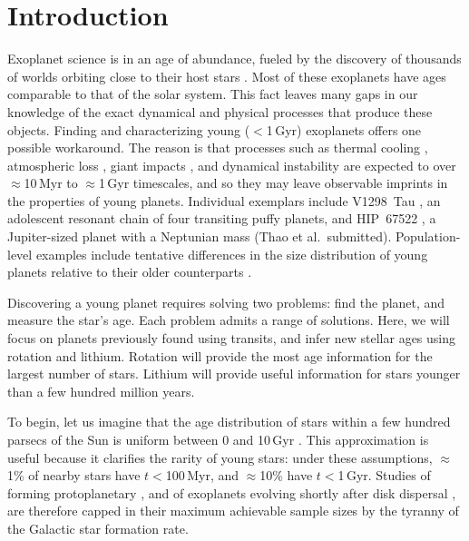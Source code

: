 \documentclass[11pt,twocolumn,tighten]{aastex63}
\begin{document}

\section{Introduction}
\label{sec:intro}

Exoplanet science is in an age of abundance, fueled by the discovery
of thousands of worlds orbiting close to their host stars
\citep{Borucki10,2015JATIS...1a4003R}.
Most of these exoplanets have ages comparable to that of the solar
system.
This fact leaves many gaps in our knowledge of the exact dynamical and
physical processes that produce these objects.
Finding and characterizing young ($<$1\,Gyr) exoplanets offers
one possible workaround.
The reason is that processes such as thermal cooling
\citep{2007ApJ...659.1661F}, atmospheric loss
\citep{2019AREPS..47...67O}, giant impacts
\citep{2014prpl.conf..595R}, and dynamical instability
\citep{2017MNRAS.470.1750I} are expected to over $\approx$10\,Myr to
$\approx$1\,Gyr timescales, and so they may leave observable imprints
in the properties of young planets.
Individual exemplars include V1298~Tau \citep{David_2019}, an
adolescent resonant chain of four transiting puffy planets, and
HIP~67522 \citep{Rizzuto_2020}, a Jupiter-sized planet with a
Neptunian mass (Thao et al.~submitted).
Population-level examples include tentative differences in the size
distribution of young planets relative to their older counterparts
\citep{Berger_2020b_rpage,David_2021,Sandoval_2021,2023AJ....166..248C,2024arXiv240303261V}.

Discovering a young planet requires solving two problems: find the
planet, and measure the star's age.  Each problem admits a range of
solutions.  Here, we will focus on planets previously found using
transits, and infer new stellar ages using rotation and lithium.
Rotation will provide the most age information for the largest number
of stars.  Lithium will provide useful information for
stars younger than a few hundred million years.

To begin, let us imagine that the age distribution of stars within a
few hundred parsecs of the Sun is uniform between 0 and 10\,Gyr
\citep[e.g.][]{Nordstrom_2004}.  This approximation is useful because
it clarifies the rarity of young stars: under these assumptions,
$\approx$1\% of nearby stars have $t$$<$100\,Myr, and $\approx$10\%
have $t$$<$1\,Gyr.  Studies of forming protoplanetary
\citep{2018A&A...617A..44K}, and of exoplanets evolving shortly after
disk dispersal \citep[e.g.][]{2022MNRAS.512.5067K}, are therefore
capped in their maximum achievable sample sizes by the tyranny of the
Galactic star formation rate.
\end{document}
